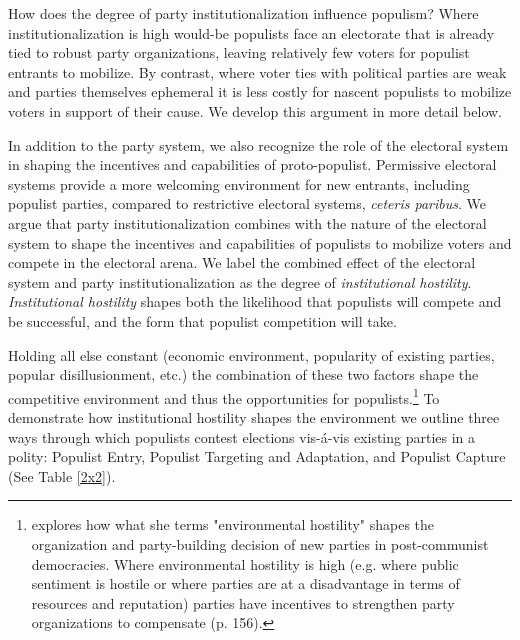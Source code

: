 \documentclass[a4paper,12pt]{article}\usepackage[]{graphicx}\usepackage[]{color}
\begin{document}
\par
How does the degree of party institutionalization influence populism? Where institutionalization is high would-be populists face an electorate that is already tied to robust party organizations, leaving relatively few voters for populist entrants to mobilize. By contrast, where voter ties with political parties are weak and parties themselves ephemeral it is less costly for nascent populists to mobilize voters in support of their cause. We develop this argument in more detail below.
\par
In addition to the party system, we also recognize the role of the electoral system in shaping the incentives and capabilities of proto-populist. Permissive electoral systems provide a more welcoming environment for new entrants, including populist parties, compared to restrictive electoral systems, \textit{ceteris paribus}. We argue that party institutionalization combines with the nature of the electoral system to shape the incentives and capabilities of populists to mobilize voters and compete in the electoral arena. We label the combined effect of the electoral system and party institutionalization as the degree of \textit{institutional hostility}. \textit{Institutional hostility} shapes both the likelihood that populists will compete and be successful, and the form that populist competition will take. 
\par
Holding all else constant (economic environment, popularity of existing parties, popular disillusionment, etc.) the combination of these two factors shape the competitive environment and thus the opportunities for populists.\footnote{\cite{tavits2013post} explores how what she terms "environmental hostility" shapes the organization and party-building decision of new parties in post-communist democracies. Where environmental hostility is high (e.g. where public sentiment is hostile or where parties are at a disadvantage in terms of resources and reputation) parties have incentives to strengthen party organizations to compensate (p. 156).} To demonstrate how institutional hostility shapes the environment we outline three ways through which populists contest elections vis-\'{a}-vis existing parties in a polity: Populist Entry, Populist Targeting and Adaptation, and Populist Capture (See Table \ref{2x2}).
\end{document}
